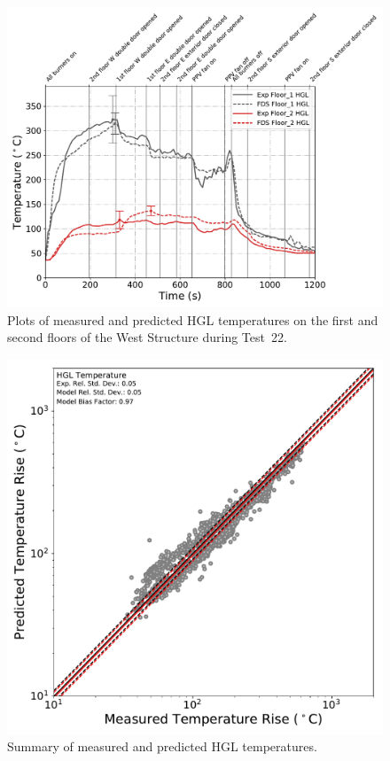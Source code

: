 \begin{figure}[!h]
	\centering
	\includegraphics[width=\columnwidth]{Figures/Plots/Validation/Temperature/Test_22_HGL}
	\caption[Plots of measured and predicted HGL temperatures during Test~22.]{Plots of measured and predicted HGL temperatures on the first and second floors of the West Structure during Test~22.}
	\label{fig:HGL_data}
\end{figure}

\begin{figure}[!h]
	\centering
	\includegraphics[width=\columnwidth]{Figures/Plots/Validation/Temperature/loglog_HGL}
	\caption{Summary of measured and predicted HGL temperatures.}
	\label{fig:loglog_HGL}
\end{figure}


